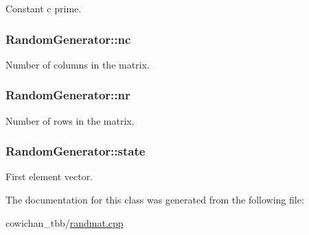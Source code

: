 Constant c prime. \hypertarget{class_random_generator_b2273a84d69579c9e9e89d0073ced26c}{
\subsubsection[{nc}]{ {\bf RandomGenerator::nc}}}
\label{class_random_generator_b2273a84d69579c9e9e89d0073ced26c}


Number of columns in the matrix. \hypertarget{class_random_generator_ccc3239cc9aa8571936ca78b0e82adde}{
\subsubsection[{nr}]{ {\bf RandomGenerator::nr}}}
\label{class_random_generator_ccc3239cc9aa8571936ca78b0e82adde}


Number of rows in the matrix. \hypertarget{class_random_generator_4423c35148a29e6ddd8e108a144db2ac}{
\subsubsection[{state}]{ {\bf RandomGenerator::state}}}
\label{class_random_generator_4423c35148a29e6ddd8e108a144db2ac}


First element vector. 

The documentation for this class was generated from the following file:\begin{CompactItemize}
\item 
cowichan\_\-tbb/\hyperlink{cowichan__tbb_2randmat_8cpp}{randmat.cpp}\end{CompactItemize}
